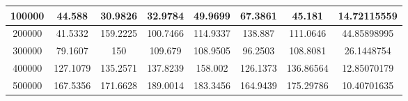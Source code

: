 \documentclass{article}
\begin{document}
\begin{table}[]
\begin{tabular}{|c|c|c|c|c|c|c|c| }
                100000	&44.588	&30.9826	&32.9784	&49.9699	&67.3861	&45.181	&14.72115559\\ \hline
                200000	&41.5332	&159.2225	&100.7466	&114.9337	&138.887	&111.0646	&44.85898995\\ \hline
                300000	&79.1607	&150	&109.679	&108.9505	&96.2503	&108.8081	&26.1448754\\ \hline
                400000	&127.1079	&135.2571&	137.8239	&158.002&	126.1373&	136.86564	&12.85070179\\ \hline
                500000	&167.5356	&171.6628&	189.0014	&183.3456	&164.9439	&175.29786&	10.40701635\\ \hline        
        \end{tabular}
    \end{table}
    
    
    
\end{document}
